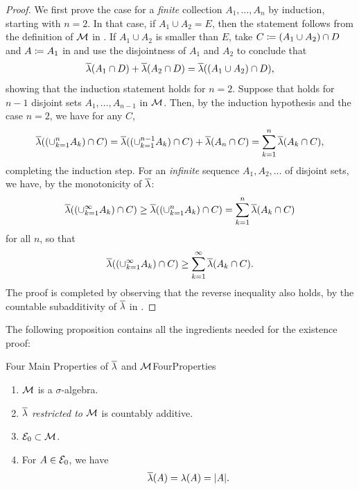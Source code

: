 \begin{proof}
	We first prove the case for a \textit{finite} collection \(A_1, \dots, A_n\) by induction, starting with \(n=2\). In that case, if \(A_1 \cup A_2 = E\), then the statement follows from the definition of \(\mathcal{M}\) in . If \(A_1 \cup A_2\) is smaller than \(E\), take \(C \coloneqq (A_1 \cup A_2) \cap D\) and \(A \coloneqq A_1\) in  and use the disjointness of \(A_1\) and \(A_2\) to conclude that
	\begin{equation*}
		\overline{\lambda}(A_1 \cap D) + \overline{\lambda}(A_2 \cap D) = \overline{\lambda}((A_1 \cup A_2) \cap D),
	\end{equation*}
	showing that the induction statement holds for \(n=2\). Suppose that  holds for \(n-1\) disjoint sets \(A_1, \dots, A_{n-1}\) in \(\mathcal{M}\). Then, by the induction hypothesis and the case \(n=2\), we have for any \(C\),
	\begin{equation*}
		\overline{\lambda}((\cup_{k=1}^n A_k) \cap C) = \overline{\lambda}((\cup_{k=1}^{n-1} A_k) \cap C) + \overline{\lambda}(A_n \cap C) = \sum_{k=1}^n \overline{\lambda}(A_k \cap C),
	\end{equation*}
	completing the induction step. For an \textit{infinite} sequence \(A_1, A_2, \dots\) of disjoint sets, we have, by the monotonicity of \(\overline{\lambda}\):
	\begin{equation*}
		\overline{\lambda}((\cup_{k=1}^\infty A_k) \cap C) \ge \overline{\lambda}((\cup_{k=1}^n A_k) \cap C) = \sum_{k=1}^n \overline{\lambda}(A_k \cap C)
	\end{equation*}
	for all \(n\), so that
	\begin{equation*}
		\overline{\lambda}((\cup_{k=1}^\infty A_k) \cap C) \ge \sum_{k=1}^\infty \overline{\lambda}(A_k \cap C).
	\end{equation*}
	The proof is completed by observing that the reverse inequality also holds, by the countable subadditivity of \(\overline{\lambda}\) in .
\end{proof}

The following proposition contains all the ingredients needed for the existence proof:

\begin{prop}{Four Main Properties of \(\overline{\lambda}\) and \(\mathcal{M}\)}{FourProperties}
	\begin{enumerate}
		\item \(\mathcal{M}\) is a \(\sigma\)-algebra.
		\item \(\overline{\lambda}\) \textit{restricted to} \(\mathcal{M}\) is countably additive.
		\item \(\mathcal{E}_0 \subset \mathcal{M}\).
		\item For \(A \in \mathcal{E}_0\), we have
		      \begin{equation}
			      \overline{\lambda}(A) = \lambda(A) = \lvert A\rvert.
			      \label{eq:ExtensionConsistency}
		      \end{equation}
	\end{enumerate}
\end{prop}

